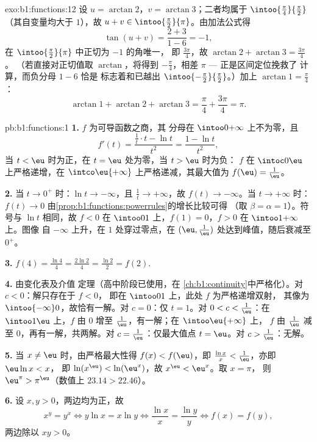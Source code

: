 \begin{solution}{exo:b1:functions:12}
设 $u = \arctan 2$，$v = \arctan 3$；二者均属于
$\intoo{\frac\pi4}{\frac\pi2}$（其自变量均大于 $1$），故 $u
+ v \in \intoo{\frac\pi2}{\pi}$。由加法公式得
\[
\tan(u + v) = \frac{2 + 3}{1 - 6} = -1 ,
\]
在 $\intoo{\frac\pi2}{\pi}$ 中正切为 $-1$ 的角唯一，
即 $\frac{3\pi}4$，故 $\arctan 2 + \arctan 3 = \frac{3\pi}4$。
（若直接对正切值取 $\arctan$，将得到
$-\frac\pi4$，相差 $\pi$ --- 正是区间定位挽救了
计算，而负分母 $1 - 6$ 恰是
标志着和已越出
$\intoo{-\frac\pi2}{\frac\pi2}$。）加上 $\arctan 1 = \frac\pi4$：
\[
\arctan 1 + \arctan 2 + \arctan 3 = \frac\pi4 + \frac{3\pi}4 = \pi .
\]
\end{solution}

\begin{solution}{pb:b1:functions:1}
\textbf{1.} $f$ 为可导函数之商，其
分母在 $\intoo0{+\infty}$ 上不为零，且
\[
f'(t) = \frac{\frac1t \cdot t - \ln t}{t^2} = \frac{1 - \ln
t}{t^2} ,
\]
当 $t < \eu$ 时为正，在 $t = \eu$ 处为零，当 $t > \eu$ 时为负：
$f$ 在 $\intoc0\eu$ 上严格递增，在
$\intco\eu{+\infty}$ 上严格递减，其最大值为 $f(\eu) = \frac1\eu$。

\textbf{2.} 当 $t \to 0^+$ 时：$\ln t \to -\infty$，且 $\frac1t \to
+\infty$，故 $f(t) \to -\infty$。当 $t \to +\infty$ 时：$f(t) \to 0$
由\cref{prop:b1:functions:powerrules}的增长比较可得
（取 $\beta = \alpha = 1$）。符号与 $\ln t$ 相同，故 $f < 0$ 在
$\intoo01$ 上，$f(1) = 0$，$f > 0$ 在 $\intoo1{+\infty}$ 上。图像
自 $-\infty$ 上升，在 $1$ 处穿过零点，在 $(\eu,
\frac1\eu)$ 处达到峰值，随后衰减至 $0^+$。

\textbf{3.} $f(4) = \frac{\ln 4}4 = \frac{2\ln 2}4 = \frac{\ln 2}2
= f(2)$.

\textbf{4.} 由变化表及介值
定理（高中阶段已使用，在
\cref{ch:b1:continuity}中严格化）。对 $c < 0$：解只存在于 $f < 0$，
即在 $\intoo01$ 上，此处 $f$ 为严格递增双射，
其像为 $\intoo{-\infty}0$，故恰有一解。对 $c = 0$：仅
$t = 1$。对 $0 < c < \frac1\eu$：在 $\intoo1\eu$ 上，$f$ 由
$0$ 增至 $\frac1\eu$，有一解；在 $\intoo\eu{+\infty}$ 上，
$f$ 由 $\frac1\eu$ 减至 $0$，再有一解，共两解。对
$c = \frac1\eu$：仅最大值点 $t = \eu$。对 $c >
\frac1\eu$：无解。

\textbf{5.} 当 $x \neq \eu$ 时，由严格最大性得 $f(x) <
f(\eu)$，即 $\frac{\ln x}x < \frac1\eu$，亦即 $\eu\ln x < x$，
即 $\ln(x^\eu) < \ln(\eu^x)$，故 $x^\eu < \eu^x$。取 $x = \pi$，
则 $\eu^\pi > \pi^\eu$（数值上 $23.14 > 22.46$）。

\textbf{6.} 设 $x, y > 0$，两边均为正，故
\[
x^y = y^x \iff y\ln x = x\ln y \iff \frac{\ln x}x = \frac{\ln y}y
\iff f(x) = f(y) ,
\]
两边除以 $xy > 0$。


\end{solution}
